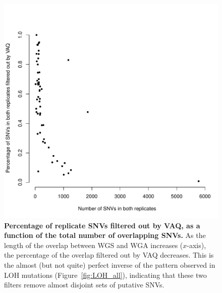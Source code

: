 \documentclass[11 pt]{article} %
\begin{document}
\begin{figure}
\centerline{
\includegraphics[width=5in]{Figure8.pdf} }
\caption{ \textbf{Percentage of replicate SNVs filtered out by VAQ, as a function of the total number of overlapping SNVs.} As the length of the overlap between WGS and WGA increases ($x$-axis), the percentage of the overlap filtered out by VAQ decreases. This is the almost (but not quite) perfect inverse of the pattern observed in LOH mutations (Figure~\ref{fig:LOH_all}), indicating that these two filters remove almost disjoint sets of putative SNVs.}
\label{fig:VAQ_all}
\end{figure}
\end{document}
